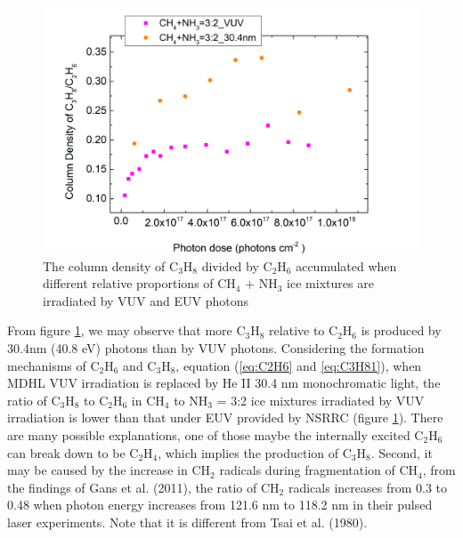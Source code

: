 \begin{figure}
\centering
\includegraphics[width=\textwidth]{figures/chapter3/VUV_EUV_C3H8_C2H6.png}
\caption{The column density of C$_3$H$_8$ divided by C$_2$H$_6$ accumulated when different relative proportions of CH$_4$ + NH$_3$ ice mixtures are irradiated by VUV and EUV photons}
\label{fig:NSRRC_Lab_C3H8_C2H6}
\end{figure}


From figure \ref{fig:NSRRC_Lab_C3H8_C2H6}, we may observe that more C$_3$H$_8$ relative to C$_2$H$_6$ is produced by 30.4nm (40.8 eV) photons than by VUV photons. Considering the formation mechanisms of C$_2$H$_6$ and C$_3$H$_8$, equation (\ref{eq:C2H6} and \ref{eq:C3H81}), when MDHL VUV irradiation is replaced by He II 30.4 nm monochromatic light, the ratio of C$_3$H$_8$ to C$_2$H$_6$ in CH$_4$ to NH$_3$ = 3:2 ice mixtures irradiated by VUV irradiation is lower than that under EUV provided by NSRRC (figure \ref{fig:NSRRC_Lab_C3H8_C2H6}). There are many possible explanations, one of those maybe the internally excited C$_2$H$_6$ can break down to be C$_2$H$_4$, which implies the production of C$_3$H$_8$. Second, it may be caused by the increase in CH$_2$ radicals during fragmentation of CH$_4$, from the findings of Gans et al. (2011)\cite{gans2011photolysis}, the ratio of CH$_2$ radicals increases from 0.3 to 0.48 when photon energy increases from 121.6 nm to 118.2 nm in their pulsed laser experiments. Note that it is different from Tsai et al. (1980)\cite{tsai1980mass}.\\



